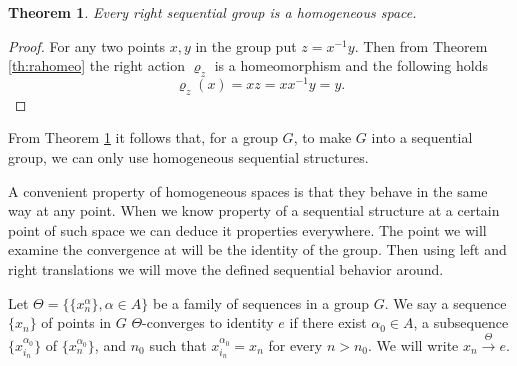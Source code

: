 \documentclass[12pt]{article}
\newtheorem{theorem}{Theorem}
\theoremstyle{definition}
\theoremstyle{remark}
\begin{document}
\begin{theorem}\label{th:homogengr}
Every right sequential group is a homogeneous space.
\end{theorem}
\begin{proof}
For any two points $x,y$ in the group put $z=x^{-1}y$. Then from Theorem \ref{th:rahomeo} the right action $\varrho_z$ is a homeomorphism and the following holds
\[
	\varrho_z(x)=xz=xx^{-1}y=y.
\]
\end{proof}

From Theorem \ref{th:homogengr} it follows that, for a group $G$, to make $G$ into a sequential group, we can only use homogeneous sequential structures.

A convenient property of homogeneous spaces is that they behave in the same way at any point. When we know property of a sequential structure at a certain point of such space we can deduce it properties everywhere. The point we will examine the convergence at will be the identity of the group. Then using left and right translations we will move the defined sequential behavior around.

Let $\Theta=\{\{x_n^\alpha\}, \alpha\in A\}$ be a family of sequences in a group $G$. We say a sequence $\{x_n\}$ of points in $G$ $\Theta$-converges to identity $e$ if there exist $\alpha_0\in A$, a subsequence $\{x_{i_n}^{\alpha_0}\}$ of $\{x_n^{\alpha_0}\}$, and $n_0$ such that $x_{i_n}^{\alpha_0} = x_n$ for every $n>n_0$. We will write $x_n\stackrel{\Theta}{\to} e$.
\end{document}
